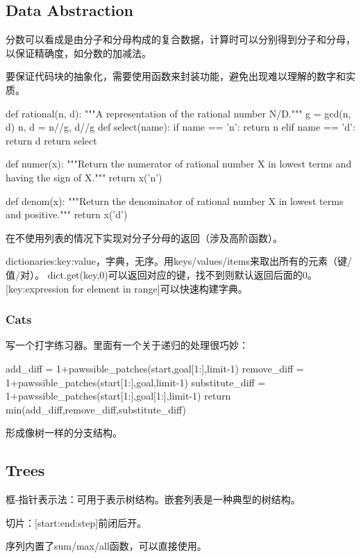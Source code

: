\documentclass{ctexart}
\begin{document}
\subsection{Data Abstraction}

分数可以看成是由分子和分母构成的复合数据，计算时可以分别得到分子和分母，以保证精确度，如分数的加减法。

要保证代码块的抽象化，需要使用函数来封装功能，避免出现难以理解的数字和实质。
\begin{python}
    def rational(n, d):
    """A representation of the rational number N/D."""
    g = gcd(n, d)
    n, d = n//g, d//g
    def select(name):
        if name == 'n':
            return n
        elif name == 'd':
            return d
    return select

def numer(x):
    """Return the numerator of rational number X in lowest terms and having
    the sign of X."""
    return x('n')

def denom(x):
    """Return the denominator of rational number X in lowest terms and positive."""
    return x('d')
\end{python}
在不使用列表的情况下实现对分子分母的返回（涉及高阶函数）。

dictionaries:{key:value}，字典，无序。用keys/values/items来取出所有的元素（键/值/对）。
dict.get(key,0)可以返回对应的键，找不到则默认返回后面的0。
[key:expression for element in range]可以快速构建字典。

\subsubsection{Cats}

写一个打字练习器。里面有一个关于递归的处理很巧妙：
\begin{python}
        add_diff = 1+pawssible_patches(start,goal[1:],limit-1)
        remove_diff = 1+pawssible_patches(start[1:],goal,limit-1)
        substitute_diff = 1+pawssible_patches(start[1:],goal[1:],limit-1)
        return min(add_diff,remove_diff,substitute_diff)
\end{python}
形成像树一样的分支结构。

\subsection{Trees}

框-指针表示法：可用于表示树结构。嵌套列表是一种典型的树结构。

切片：[start:end:step]前闭后开。

序列内置了sum/max/all函数，可以直接使用。
\end{document}
